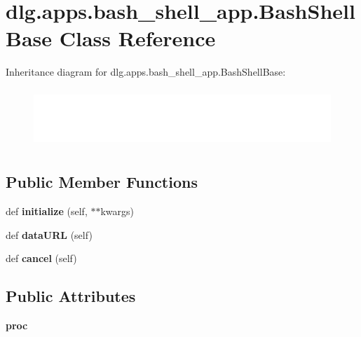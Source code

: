 \hypertarget{classdlg_1_1apps_1_1bash__shell__app_1_1_bash_shell_base}{}\section{dlg.\+apps.\+bash\+\_\+shell\+\_\+app.\+Bash\+Shell\+Base Class Reference}
\label{classdlg_1_1apps_1_1bash__shell__app_1_1_bash_shell_base}
Inheritance diagram for dlg.\+apps.\+bash\+\_\+shell\+\_\+app.\+Bash\+Shell\+Base\+:\begin{figure}[H]
\begin{center}
\leavevmode
\includegraphics[height=2.228856cm]{classdlg_1_1apps_1_1bash__shell__app_1_1_bash_shell_base}
\end{center}
\end{figure}
\subsection*{Public Member Functions}
\begin{DoxyCompactItemize}
\item 
\mbox{\label{classdlg_1_1apps_1_1bash__shell__app_1_1_bash_shell_base_aa9c7cc5bd75613f4b564ac54d8c1e081}} 
def {\bfseries initialize} (self, $\ast$$\ast$kwargs)
\item 
\mbox{\label{classdlg_1_1apps_1_1bash__shell__app_1_1_bash_shell_base_a8c62669066762367db1958528e7ffef8}} 
def {\bfseries data\+U\+RL} (self)
\item 
\mbox{\label{classdlg_1_1apps_1_1bash__shell__app_1_1_bash_shell_base_a9d557859451bf779fc61b2c5c8529df3}} 
def {\bfseries cancel} (self)
\end{DoxyCompactItemize}
\subsection*{Public Attributes}
\begin{DoxyCompactItemize}
\item 
\mbox{\label{classdlg_1_1apps_1_1bash__shell__app_1_1_bash_shell_base_a2dbc7b102dfa6263023c664051aed055}} 
{\bfseries proc}
\end{DoxyCompactItemize}

